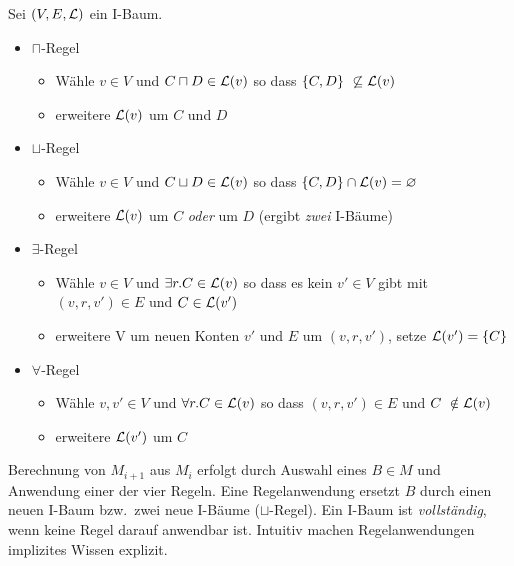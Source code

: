 Sei $\left( V,E,\ML \right)$ ein I-Baum.

\begin{itemize}
\item $\sqcap$-Regel
  \begin{itemize}
  \item
    Wähle $v \in V$ und $C \sqcap D \in \ML\left( v \right)$ so dass
    $\left\{ C,D \right\}\  \not\subseteq \ML\left( v \right)$
  \item
    erweitere $\mathcal{L}(v)$ um $C$ und $D$
  \end{itemize}
\item $\sqcup$-Regel

  \begin{itemize}
  \item
    Wähle $v \in V$ und $C \sqcup D \in \ML\left( v \right)$ so dass
    $\left\{ C,D \right\} \cap \ML\left( v \right) = \emptyset$
  \item
      erweitere $\mathcal{L}(v)$ um $C$ \emph{oder} um $D$ (ergibt \emph{zwei} I-Bäume)
  \end{itemize}
\item $\exists$-Regel

  \begin{itemize}
  \item
    Wähle $v \in V$ und $\exists r.C \in \ML\left( v \right)$ so dass
    es kein $v' \in V$ gibt mit $\left( v,r,v' \right) \in E$
    und $C \in \ML\left( v' \right)$
  \item
    erweitere V um neuen Konten $v'$ und $E$ um
    $\left( v,r,v' \right)$, setze
    $\ML\left( v' \right) = \left\{ C \right\}$
  \end{itemize}
\item $\forall$-Regel
  \begin{itemize}
  \item
    Wähle $v,v' \in V$ und $\forall r.C \in \ML\left( v \right)$ so
    dass $\left( v,r,v' \right) \in E$ und
    $C\  \notin \ML\left( v \right)$
  \item
    erweitere $\mathcal{L}(v')$ um $C$
  \end{itemize}
\end{itemize}

Berechnung von $M_{i + 1}$ aus $M_i$ erfolgt durch Auswahl eines $B \in M$ und
Anwendung einer der vier Regeln. Eine Regelanwendung ersetzt $B$ durch einen
neuen I-Baum bzw.\ zwei neue I-Bäume ($\sqcup$-Regel). Ein I-Baum ist \emph{vollständig}, wenn keine Regel darauf anwendbar ist. Intuitiv machen Regelanwendungen implizites Wissen explizit.

